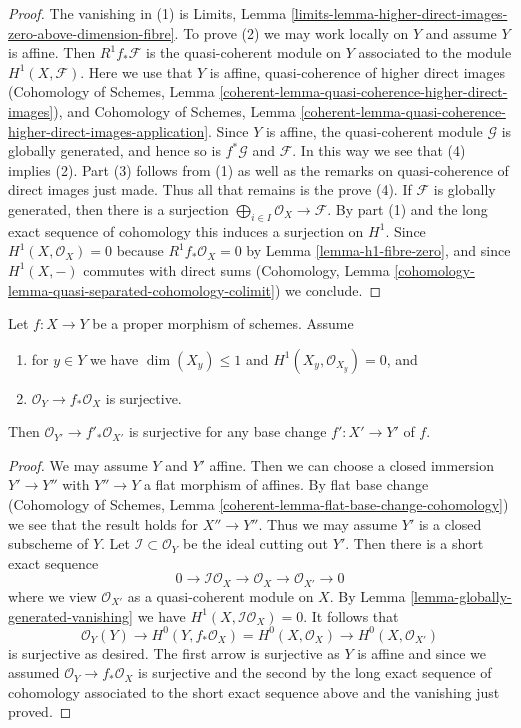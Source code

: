 \begin{proof}
The vanishing in (1) is Limits, Lemma
\ref{limits-lemma-higher-direct-images-zero-above-dimension-fibre}.
To prove (2) we may work locally on $Y$ and assume $Y$ is affine.
Then $R^1f_*\mathcal{F}$ is the quasi-coherent module on $Y$
associated to the module $H^1(X, \mathcal{F})$.
Here we use that $Y$ is affine, quasi-coherence of higher direct
images (Cohomology of Schemes, Lemma
\ref{coherent-lemma-quasi-coherence-higher-direct-images}), and
Cohomology of Schemes, Lemma
\ref{coherent-lemma-quasi-coherence-higher-direct-images-application}.
Since $Y$ is affine, the quasi-coherent module $\mathcal{G}$
is globally generated, and hence so is $f^*\mathcal{G}$
and $\mathcal{F}$.
In this way we see that (4) implies (2).
Part (3) follows from (1) as well as the remarks on
quasi-coherence of direct images just made. Thus
all that remains is the prove (4).
If $\mathcal{F}$ is globally generated, then there is a surjection
$\bigoplus_{i \in I} \mathcal{O}_X \to \mathcal{F}$. By part (1)
and the long exact sequence of cohomology this
induces a surjection on $H^1$. Since $H^1(X, \mathcal{O}_X) = 0$
because $R^1f_*\mathcal{O}_X = 0$ by
Lemma \ref{lemma-h1-fibre-zero}, and
since $H^1(X, -)$ commutes with direct sums
(Cohomology, Lemma \ref{cohomology-lemma-quasi-separated-cohomology-colimit})
we conclude.
\end{proof}

\begin{lemma}
\label{lemma-h1-fibre-zero-check-h0-kappa}
Let $f : X \to Y$ be a proper morphism of schemes. Assume
\begin{enumerate}
\item for $y \in Y$ we have $\dim(X_y) \leq 1$ and
$H^1(X_y, \mathcal{O}_{X_y}) = 0$, and
\item $\mathcal{O}_Y \to f_*\mathcal{O}_X$ is surjective.
\end{enumerate}
Then $\mathcal{O}_{Y'} \to f'_*\mathcal{O}_{X'}$ is surjective
for any base change $f' : X' \to Y'$ of $f$.
\end{lemma}

\begin{proof}
We may assume $Y$ and $Y'$ affine. Then we can choose a closed
immersion $Y' \to Y''$ with $Y'' \to Y$ a flat morphism of affines.
By flat base change
(Cohomology of Schemes, Lemma \ref{coherent-lemma-flat-base-change-cohomology})
we see that the result holds for $X'' \to Y''$.
Thus we may assume $Y'$ is a closed subscheme of $Y$.
Let $\mathcal{I} \subset \mathcal{O}_Y$ be the ideal cutting out $Y'$.
Then there is a short exact sequence
$$
0 \to \mathcal{I}\mathcal{O}_X \to
\mathcal{O}_X \to \mathcal{O}_{X'} \to 0
$$
where we view $\mathcal{O}_{X'}$ as a quasi-coherent module on $X$.
By Lemma \ref{lemma-globally-generated-vanishing}
we have $H^1(X, \mathcal{I}\mathcal{O}_X) = 0$.
It follows that
$$
\mathcal{O}_Y(Y) \to
H^0(Y, f_*\mathcal{O}_X) = H^0(X, \mathcal{O}_X) \to
H^0(X, \mathcal{O}_{X'})
$$
is surjective as desired. The first arrow is surjective as $Y$
is affine and since we assumed $\mathcal{O}_Y \to f_*\mathcal{O}_X$
is surjective and the second by the long exact sequence of
cohomology associated to the short exact sequence above and
the vanishing just proved.
\end{proof}

